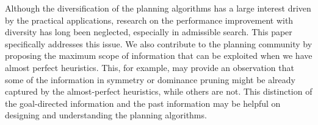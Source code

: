 Although the diversification of the planning algorithms has a large interest driven by the practical applications, research on the performance improvement with diversity has long been neglected, especially in admissible search. This paper specifically addresses this issue. We also  contribute to the planning community by proposing the maximum scope of information that can be exploited when we have almost perfect heuristics. This, for example, may provide an observation that some of the information in symmetry or dominance pruning might be already captured by the almost-perfect heuristics, while others are not. This distinction of the goal-directed information and the past information may be helpful on designing and understanding the planning algorithms.

